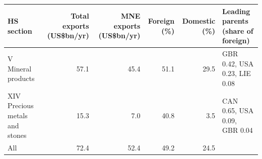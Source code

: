 \begin{tabular}{@{}l r r r r l@{}}
\toprule
HS section & Total exports (US\$bn/yr) & MNE exports (US\$bn/yr) & Foreign (\%) & Domestic (\%) & Leading parents (share of foreign) \\
\midrule
V Mineral products & 57.1 & 45.4 & 51.1 & 29.5 & GBR 0.42, USA 0.23, LIE 0.08 \\
XIV Precious metals and stones & 15.3 & 7.0 & 40.8 & 3.5 & CAN 0.65, USA 0.09, GBR 0.04 \\
\midrule
All & 72.4 & 52.4 & 49.2 & 24.5 & \\
\bottomrule
\end{tabular}
